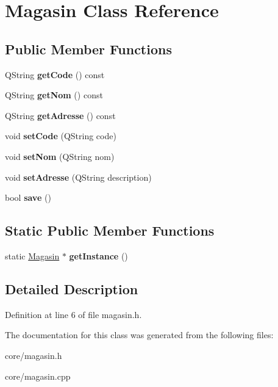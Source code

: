 \hypertarget{class_magasin}{
\section{Magasin Class Reference}
\label{class_magasin}
}
\subsection*{Public Member Functions}
\begin{DoxyCompactItemize}
\item 
\hypertarget{class_magasin_a2cbc709e2a2ff257c94fc72ee1008d29}{
QString {\bfseries getCode} () const }
\label{class_magasin_a2cbc709e2a2ff257c94fc72ee1008d29}

\item 
\hypertarget{class_magasin_a193e49a031ae32bc04fc45a8f4f1fe71}{
QString {\bfseries getNom} () const }
\label{class_magasin_a193e49a031ae32bc04fc45a8f4f1fe71}

\item 
\hypertarget{class_magasin_af2a69b549629c3ad6ad34374af8457bd}{
QString {\bfseries getAdresse} () const }
\label{class_magasin_af2a69b549629c3ad6ad34374af8457bd}

\item 
\hypertarget{class_magasin_a320db7f9bbb684db8a288b83b28189c4}{
void {\bfseries setCode} (QString code)}
\label{class_magasin_a320db7f9bbb684db8a288b83b28189c4}

\item 
\hypertarget{class_magasin_ae07c3c19b79204ffece1b339dc27b678}{
void {\bfseries setNom} (QString nom)}
\label{class_magasin_ae07c3c19b79204ffece1b339dc27b678}

\item 
\hypertarget{class_magasin_a516a929cb3e31f9a892d1167b970e85d}{
void {\bfseries setAdresse} (QString description)}
\label{class_magasin_a516a929cb3e31f9a892d1167b970e85d}

\item 
\hypertarget{class_magasin_ae0d6c929e52662f750368cf3e68a3337}{
bool {\bfseries save} ()}
\label{class_magasin_ae0d6c929e52662f750368cf3e68a3337}

\end{DoxyCompactItemize}
\subsection*{Static Public Member Functions}
\begin{DoxyCompactItemize}
\item 
\hypertarget{class_magasin_a4fbd03ebbe5e0b6918d989d9f69ab649}{
static \hyperlink{class_magasin}{Magasin} $\ast$ {\bfseries getInstance} ()}
\label{class_magasin_a4fbd03ebbe5e0b6918d989d9f69ab649}

\end{DoxyCompactItemize}


\subsection{Detailed Description}


Definition at line 6 of file magasin.h.



The documentation for this class was generated from the following files:\begin{DoxyCompactItemize}
\item 
core/magasin.h\item 
core/magasin.cpp\end{DoxyCompactItemize}
